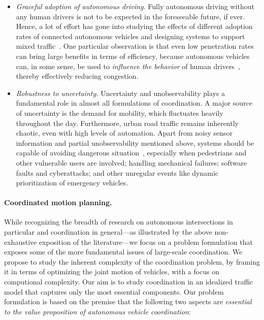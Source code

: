 \documentclass[a4paper]{report}
\theoremstyle{definition}
\theoremstyle{plain}
\begin{document}
\begin{itemize}
  \item \emph{Graceful adoption of autonomous driving.} Fully autonomous driving
        without any human drivers is not to be expected in the foreseeable
        future, if ever. Hence, a lot of effort has gone into studying the
        effects of different adoption rates of connected autonomous vehicles and
        designing systems to support mixed
        traffic~\cite{liSurveyUrbanTraffic2023}.
        One particular observation is that even low penetration rates can bring
        large benefits in terms of efficiency, because autonomous vehicles can,
        in some sense, be used to \emph{influence the behavior} of human
        drivers~\cite{wangLearningControlCoordinate2025}, thereby effectively
        reducing congestion.

  \item \emph{Robustness to uncertainty.}
        Uncertainty and unobservability plays a fundamental role in almost all
        formulations of coordination.
        A major source of uncertainty is the demand for mobility, which
        fluctuates heavily throughout the day.
        Furthermore, urban road traffic remains inherently chaotic, even with
        high levels of automation.
        Apart from noisy sensor information and partial unobservability
        mentioned above, systems should be capable of avoiding dangerous
        situation~\cite{yuUncertaintyAwareSafetyCriticalDecision2025},
        especially when pedestrians and other vulnerable users are involved;
        handling mechanical failures; software faults and cyberattacks; and
        other unregular events like dynamic prioritization of emergency
        vehicles.
\end{itemize}


\paragraph{Coordinated motion planning.}


While recognizing the breadth of research on autonomous intersections in
particular and coordination in general---as illustrated by the above
non-exhaustive exposition of the literature---we focus on a problem formulation
that exposes some of the more fundamental issues of large-scale coordination.
%
We propose to study the inherent complexity of the coordination problem, by
framing it in terms of optimizing the joint motion of vehicles, with a focus on
computional complexity.
%
Our aim is to study coordination in an idealized traffic model that captures
only the most essential components.
%
Our problem formulation is based on the premise that the following two aspects
are \emph{essential to the value proposition of autonomous vehicle
  coordination}:
\end{document}
